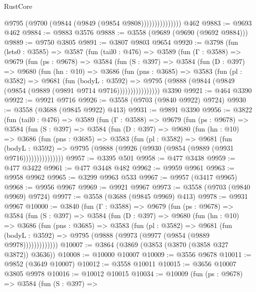 \begin{lexlean}{RustCore}
\begin{coremodule}
                        @9795 (@9700 (@9844 (@9849 (@9854 @9808)))))))))))))))
    @462
@9883 := @9693 @462
@9884 := @9883 @3576
@9888 := @3558 (@9689 (@9690 (@9692 @9884)))
@9889 := @9750 @3805
@9891 := @3807 @9803 @9654
@9920 := @3798
    (fun (lets0 : @3585) =>
    @3587
      (fun (tail0 : @476) =>
      @3589
        (fun (Γ : @3588) =>
        @9679
          (fun (ps : @9678) =>
          @3584
            (fun (S : @397) =>
            @3584
              (fun (D : @397) =>
              @9680
                (fun (hn : @10) =>
                @3686
                  (fun (pns : @3685) =>
                  @3583
                    (fun (pl : @3582) =>
                    @9681
                      (fun (bodyL : @3592) =>
                      @9795 (@9888 (@9844 (@9849 (@9854 (@9889 (@9891 @9714 @9716))))))))))))))))
    @3390
@9921 := @464 @3390
@9922 := @9921 @9716
@9926 := @3558 (@9703 (@9840 @9922) @9724)
@9930 := @3558 (@3688 (@9845 @9922) @413)
@9931 := @9891 @3390
@9956 := @3822
    (fun (tail0 : @476) =>
    @3589
      (fun (Γ : @3588) =>
      @9679
        (fun (ps : @9678) =>
        @3584
          (fun (S : @397) =>
          @3584
            (fun (D : @397) =>
            @9680
              (fun (hn : @10) =>
              @3686
                (fun (pns : @3685) =>
                @3583
                  (fun (pl : @3582) =>
                  @9681
                    (fun (bodyL : @3592) =>
                    @9795 (@9888 (@9926 (@9930 (@9854 (@9889 (@9931 @9716)))))))))))))))
@9957 := @3395 @501
@9958 := @477 @3438
@9959 := @477 @3422
@9961 := @477 @3448 @482
@9962 := @9959 @9961
@9963 := @9958 @9962
@9965 := @3299 @9963 @533
@9967 := @9957 (@3417 @9965)
@9968 := @9956 @9967
@9969 := @9921 @9967
@9973 := @3558 (@9703 (@9840 @9969) @9724)
@9977 := @3558 (@3688 (@9845 @9969) @413)
@9978 := @9931 @9967
@10000 := @3840
    (fun (Γ : @3588) =>
    @9679
      (fun (ps : @9678) =>
      @3584
        (fun (S : @397) =>
        @3584
          (fun (D : @397) =>
          @9680
            (fun (hn : @10) =>
            @3686
              (fun (pns : @3685) =>
              @3583
                (fun (pl : @3582) =>
                @9681
                  (fun (bodyL : @3592) =>
                  @9795 (@9888 (@9973 (@9977 (@9854 (@9889 @9978)))))))))))))
@10007 := @3864 (@3869 (@3853 (@3870 (@3858 @327 @3872)) @3636))
@10008 := @10000 @10007
@10009 := @3556 @9678
@10011 := @9852 (@3649 @10007)
@10012 := @3558 @10011
@10015 := @3656 @10007 @3805 @9978
@10016 := @10012 @10015
@10034 := @10009
    (fun (ps : @9678) =>
    @3584
      (fun (S : @397) =>

\end{coremodule}
\end{lexlean}
